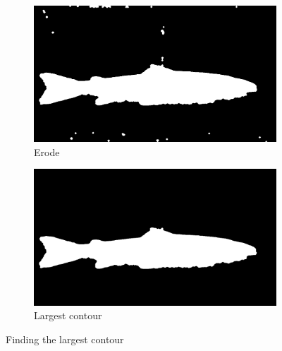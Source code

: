 \begin{figure}[H]
    \medskip
    \begin{subfigure}{0.49\textwidth}
        \includegraphics[width=\linewidth]{images/implementation/4_5_erode}
        \caption{Erode} 
        \label{fig:erode_contour}
    \end{subfigure}\hspace*{\fill}
    \begin{subfigure}{0.49\textwidth}
        \includegraphics[width=\linewidth]{images/implementation/4_largest_contour}
        \caption{Largest contour} 
        \label{fig:largest_contour_2}
    \end{subfigure}
    \caption{Finding the largest contour} 
    \label{fig:find_largest_contour}
\end{figure}


